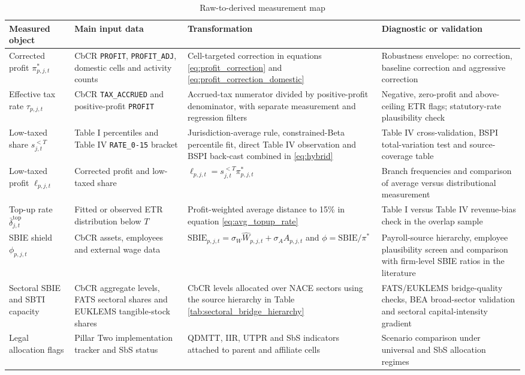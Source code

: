 \documentclass[11pt,a4paper]{article}
\newcommand{\code}[1]{\texttt{#1}}
\begin{document}
\begin{table}[H]
\centering
\caption{Raw-to-derived measurement map}
\label{tab:measurement_map}
\footnotesize
\begin{tabularx}{\textwidth}{@{}L{2.8cm}L{3.2cm}L{3.7cm}X@{}}
\toprule
Measured object & Main input data & Transformation & Diagnostic or validation \\
\midrule
Corrected profit $\pi^{*}_{p,j,t}$ & CbCR \code{PROFIT}, \code{PROFIT\_ADJ}, domestic cells and activity counts & Cell-targeted correction in equations \eqref{eq:profit_correction} and \eqref{eq:profit_correction_domestic} & Robustness envelope: no correction, baseline correction and aggressive correction \\
Effective tax rate $\tau_{p,j,t}$ & CbCR \code{TAX\_ACCRUED} and positive-profit \code{PROFIT} & Accrued-tax numerator divided by positive-profit denominator, with separate measurement and regression filters & Negative, zero-profit and above-ceiling ETR flags; statutory-rate plausibility check \\
Low-taxed share $s_{j,t}^{<T}$ & Table I percentiles and Table IV \code{RATE\_0-15} bracket & Jurisdiction-average rule, constrained-Beta percentile fit, direct Table IV observation and BSPI back-cast combined in \eqref{eq:hybrid} & Table IV cross-validation, BSPI total-variation test and source-coverage table \\
Low-taxed profit $\ell_{p,j,t}$ & Corrected profit and low-taxed share & $\ell_{p,j,t}=s_{j,t}^{<T}\pi^{*}_{p,j,t}$ & Branch frequencies and comparison of average versus distributional measurement \\
Top-up rate $\bar{\delta}_{j,t}^{\text{top}}$ & Fitted or observed ETR distribution below $T$ & Profit-weighted average distance to 15\% in equation \eqref{eq:avg_topup_rate} & Table I versus Table IV revenue-bias check in the overlap sample \\
SBIE shield $\phi_{p,j,t}$ & CbCR assets, employees and external wage data & $\text{SBIE}_{p,j,t}=\sigma_W\hat{W}_{p,j,t}+\sigma_A A_{p,j,t}$ and $\phi=\text{SBIE}/\pi^{*}$ & Payroll-source hierarchy, employee plausibility screen and comparison with firm-level SBIE ratios in the literature \\
Sectoral SBIE and SBTI capacity & CbCR aggregate levels, FATS sectoral shares and EUKLEMS tangible-stock shares & CbCR levels allocated over NACE sectors using the source hierarchy in Table \ref{tab:sectoral_bridge_hierarchy} & FATS/EUKLEMS bridge-quality checks, BEA broad-sector validation and sectoral capital-intensity gradient \\
Legal allocation flags & Pillar Two implementation tracker and SbS status & QDMTT, IIR, UTPR and SbS indicators attached to parent and affiliate cells & Scenario comparison under universal and SbS allocation regimes \\
\bottomrule
\end{tabularx}
\end{table}
\end{document}
